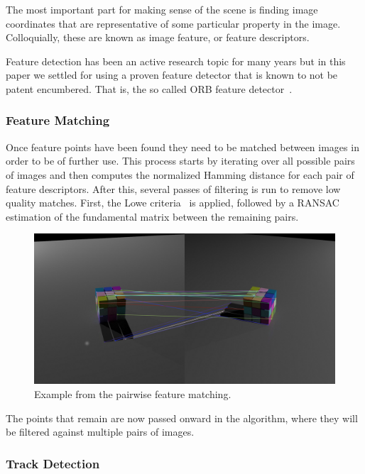 \documentclass[preprint,acmtog]{acmart}
\begin{document}
The most important part for making sense of the scene is finding image
coordinates that are representative of some particular property in the
image. Colloquially, these are known as image feature, or feature descriptors.

Feature detection has been an active research topic for many years but in this
paper we settled for using a proven feature detector that is known to not be
patent encumbered. That is, the so called ORB feature detector~\cite{orb2011}.


\subsubsection{Feature Matching}

Once feature points have been found they need to be matched between images in
order to be of further use. This process starts by iterating over all possible
pairs of images and then computes the normalized Hamming distance for each pair
of feature descriptors. After this, several passes of filtering is run to remove
low quality matches. First, the Lowe criteria~\cite{sift2004} is applied,
followed by a RANSAC~\cite{ransac} estimation of the fundamental matrix between
the remaining pairs.

\begin{figure}[ht]
  \centering
  \includegraphics[width=1.0\linewidth]{matches_3}
  \caption{Example from the pairwise feature matching.}
\end{figure}



The points that remain are now passed onward in the algorithm, where they will
be filtered against multiple pairs of images.


\subsubsection{Track Detection}
\end{document}
